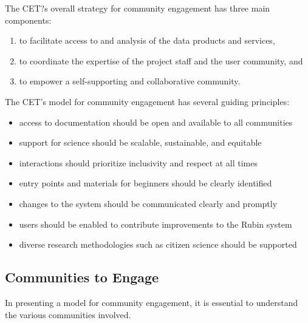 \documentclass[DM,lsstdraft,toc]{lsstdoc}
\begin{document}
The CET?s overall strategy for community engagement has three main components:
\begin{enumerate}
\item to facilitate access to and analysis of the data products and services,
\item to coordinate the expertise of the project staff and the user community, and
\item to empower a self-supporting and collaborative community.
\end{enumerate}

The CET's model for community engagement has several guiding principles:
\begin{itemize}
\item access to documentation should be open and available to all communities
\item support for science should be scalable, sustainable, and equitable
\item interactions should prioritize inclusivity and respect at all times
\item entry points and materials for beginners should be clearly identified
\item changes to the system should be communicated clearly and promptly
\item users should be enabled to contribute improvements to the Rubin system
\item diverse research methodologies such as citizen science should be supported
\end{itemize}


\subsection{Communities to Engage}\label{ssec:intro_comms}

In presenting a model for community engagement, it is essential to understand the various communities involved.
\end{document}
